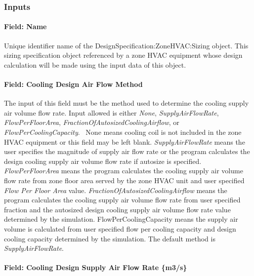 \subsubsection{Inputs}\label{inputs-5-007}

\paragraph{Field: Name}\label{designspecificationzonehvacsizing-field-name}

Unique identifier name of the DesignSpecification:ZoneHVAC:Sizing object. This sizing specification object referenced by a zone HVAC equipment whose design calculation will be made using the input data of this object.

\paragraph{Field: Cooling Design Air Flow Method}\label{field-cooling-design-air-flow-method-1}

The input of this field must be the method used to determine the cooling supply air volume flow rate. Input allowed is either \emph{None}, \emph{SupplyAirFlowRate}, \emph{FlowPerFloorArea}, \emph{FractionOfAutosizedCoolingAirflow}, or \emph{FlowPerCoolingCapacity}.~ None means cooling coil is not included in the zone HVAC equipment or this field may be left blank. \emph{SupplyAirFlowRate} means the user specifies the magnitude of supply air flow rate or the program calculates the design cooling supply air volume flow rate if autosize is specified. \emph{FlowPerFloorArea} means the program calculates the cooling supply air volume flow rate from zone floor area served by the zone HVAC unit and user specified \emph{Flow Per Floor Area} value. \emph{FractionOfAutosizedCoolingAirflow} means the program calculates the cooling supply air volume flow rate from user specified fraction and the autosized design cooling supply air volume flow rate value determined by the simulation. FlowPerCoolingCapacity means the supply air volume is calculated from user specified flow per cooling capacity and design cooling capacity determined by the simulation. The default method is \emph{SupplyAirFlowRate}.

\paragraph{Field: Cooling Design Supply Air Flow Rate \{m3/s\}}\label{field-cooling-design-supply-air-flow-rate-m3s}

